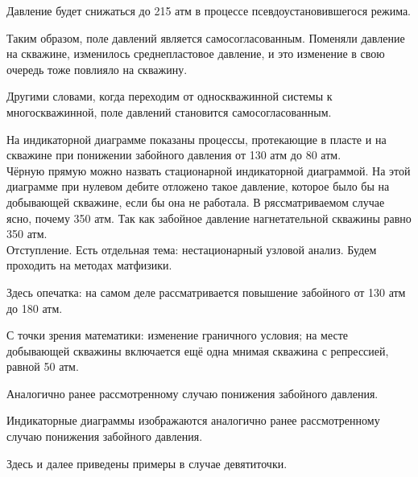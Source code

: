 \documentclass[main.tex]{subfiles}
\begin{document}
Давление будет снижаться до 215 атм в процессе псевдоустановившегося режима.

Таким образом, поле давлений является самосогласованным. Поменяли давление на скважине, изменилось среднепластовое давление, и это изменение в свою очередь тоже повлияло на скважину.

Другими словами, когда переходим от односкважинной системы к многоскважинной, поле давлений становится самосогласованным.


На индикаторной диаграмме показаны процессы, протекающие в пласте и на скважине при понижении забойного давления от 130 атм до 80 атм.\\

Чёрную прямую можно назвать стационарной индикаторной диаграммой. На этой диаграмме при нулевом дебите отложено такое давление, которое было бы на добывающей скважине, если бы она не работала. В ряссматриваемом случае ясно, почему 350 атм. Так как забойное давление нагнетательной скважины равно 350 атм.\\

Отступление. Есть отдельная тема: нестационарный узловой анализ. Будем проходить на методах матфизики.


Здесь опечатка: на самом деле рассматривается повышение забойного от 130 атм до 180 атм.

С точки зрения математики: изменение граничного условия; на месте добывающей скважины включается ещё одна мнимая скважина с репрессией, равной 50 атм.


Аналогично ранее рассмотренному случаю понижения забойного давления.


Индикаторные диаграммы изображаются аналогично ранее рассмотренному случаю понижения забойного давления.


Здесь и далее приведены примеры в случае девятиточки.





\end{document}

